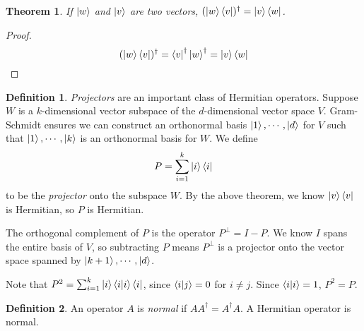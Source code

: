 \documentclass[letterpaper]{article}
\newtheorem{theorem}{Theorem}
\theoremstyle{definition}
\newtheorem{definition}{Definition}[section]
\begin{document}
\begin{theorem}
If $\ket{w}$ and $\ket{v}$ are two vectors, $(\ket{w} \bra{v})^{\dagger} = \ket{v} \bra{w}$.
\end{theorem}

\begin{proof}
$$(\ket{w} \bra{v})^{\dagger} = \bra{v}^{\dagger} \ket{w}^{\dagger} = \ket{v} \bra{w}$$
\end{proof}

\begin{definition}
\textit{Projectors} are an important class of Hermitian operators. Suppose $W$ is a $k$-dimensional vector subspace of the $d$-dimensional vector space $V$. Gram-Schmidt ensures we can construct an orthonormal basis $\ket{1}, \cdots, \ket{d}$ for $V$ such that $\ket{1}, \cdots, \ket{k}$ is an orthonormal basis for $W$. We define 
$$P = \sum_{i=1}^{k} \ket{i}\bra{i}$$
to be the \textit{projector} onto the subspace $W$. By the above theorem, we know $\ket{v} \bra{v}$ is Hermitian, so $P$ is Hermitian. 

The orthogonal complement of $P$ is the operator $P^{\perp} = I - P$. We know $I$ spans the entire basis of $V$, so subtracting $P$ means $P^{\perp}$ is a projector onto the vector space spanned by $\ket{k+1}, \cdots, \ket{d}$. 

Note that $P^{2} = \sum_{i=1}^{k} \ket{i} \braket{i | i} \bra{i}$, since $\braket{i | j} = 0$ for $i \neq j$. Since $\braket{i|i} = 1$, $P^{2} = P$. 
\end{definition}

\begin{definition}
An operator $A$ is \textit{normal} if $AA^{\dagger} = A^{\dagger} A$. A Hermitian operator is normal. 
\end{definition} 
\end{document}
